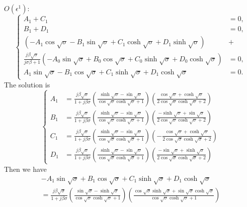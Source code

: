\documentclass{article}
\begin{document}
\noindent
$O(\epsilon^1)$:
\begin{equation}
    \left\{\begin{aligned}
        A_1 + C_1 &= 0, \\
        B_1 + D_1 &= 0, \\
        \left( - A_1 \cos{\sqrt{\sigma}} - B_1 \sin{\sqrt{\sigma}} + C_1 \cosh{\sqrt{\sigma}} + D_1 \sinh{\sqrt{\sigma}} \right) &+ \\
        \frac{j \beta \sqrt{\sigma}}{ j\sigma \beta + 1 } \left( - A_0 \sin{\sqrt{\sigma}} + B_0 \cos{\sqrt{\sigma}} + C_0 \sinh{\sqrt{\sigma}} + D_0 \cosh{\sqrt{\sigma}} \right) &= 0, \\
        A_1 \sin{\sqrt{\sigma}} - B_1 \cos{\sqrt{\sigma}} + C_1 \sinh{\sqrt{\sigma}} + D_1 \cosh{\sqrt{\sigma}} &= 0.
    \end{aligned}\right.
\end{equation}
The solution is
\begin{equation}
    \left\{\begin{aligned}
        A_1 &= \frac{j \beta  \sqrt{\sigma }}{1+j \beta  \sigma } \left( \frac{\sinh\sqrt{\sigma }-\sin\sqrt{\sigma }}{\cos\sqrt{\sigma } \cosh\sqrt{\sigma }+1} \right) \left(\frac{\cos\sqrt{\sigma }+\cosh\sqrt{\sigma }}{2 \cos\sqrt{\sigma }\cosh\sqrt{\sigma }+2} \right) \\
        B_1 &= \frac{j \beta  \sqrt{\sigma }}{1+j \beta  \sigma } \left( \frac{\sinh\sqrt{\sigma }-\sin\sqrt{\sigma }}{\cos\sqrt{\sigma } \cosh\sqrt{\sigma }+1} \right) \left( \frac{-\sinh\sqrt{\sigma }+\sin\sqrt{\sigma }}{2 \cos\sqrt{\sigma }\cosh\sqrt{\sigma }+2} \right)\\
        C_1 &= \frac{j \beta  \sqrt{\sigma }}{1+j \beta  \sigma } \left( \frac{\sinh\sqrt{\sigma }-\sin\sqrt{\sigma }}{\cos\sqrt{\sigma } \cosh\sqrt{\sigma }+1} \right) \left( -\frac{\cos\sqrt{\sigma }+\cosh\sqrt{\sigma }}{2 \cos\sqrt{\sigma } \cosh\sqrt{\sigma }+2} \right)\\
        D_1 &= \frac{j \beta  \sqrt{\sigma }}{1+j \beta  \sigma } \left( \frac{\sinh\sqrt{\sigma }-\sin\sqrt{\sigma }}{\cos\sqrt{\sigma } \cosh\sqrt{\sigma }+1} \right) \left( \frac{-\sin\sqrt{\sigma }+\sinh\sqrt{\sigma }}{2 \cos\sqrt{\sigma }\cosh\sqrt{\sigma }+2} \right)
    \end{aligned}\right.
\end{equation}
Then we have
\begin{equation}
    \begin{aligned}
        - A_1 \sin{\sqrt{\sigma}} + B_1 \cos{\sqrt{\sigma}} + C_1 \sinh{\sqrt{\sigma}} + D_1 \cosh{\sqrt{\sigma}} \\
        = \frac{j \beta  \sqrt{\sigma }}{1+j \beta  \sigma } \left(\frac{\sin\sqrt{\sigma } -\sinh\sqrt{\sigma }}{\cos\sqrt{\sigma } \cosh\sqrt{\sigma }+1} \right)  \left( \frac{\cos\sqrt{\sigma } \sinh\sqrt{\sigma }+\sin\sqrt{\sigma } \cosh\sqrt{\sigma }}{\cos\sqrt{\sigma } \cosh\sqrt{\sigma }+1} \right)
    \end{aligned}
\end{equation}
\end{document}
